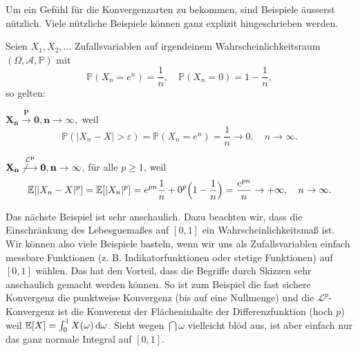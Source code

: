 Um ein Gef\"uhl f\"ur die Konvergenzarten zu bekommen, sind Beispiele \"ausserst n\"utzlich. Viele n\"utzliche Beispiele k\"onnen ganz explizit hingeschrieben werden.
\begin{beispiel}
	Seien $X_1, X_2, ... $ Zufallsvariablen auf irgendeinem Wahrscheinlichkeitsraum $(\Omega, \mathcal A,\mathbb P)$ mit  $$\mathbb{P}(X_n = e^n) = \frac{1}{n}, \quad \mathbb{P}(X_n = 0) = 1 - \frac{1}{n},$$ so gelten:\smallskip
	
	$\mathbf{X_n \overset{P}{\longrightarrow} 0, n \to \infty},$ weil $$\mathbb{P}(|X_n - X| > \varepsilon) = \mathbb{P}(X_n = e^n)=\frac{1}{n}\to 0, \quad n\to\infty.$$
	
	$\mathbf{X_n \overset{\mathcal{L}^p}{\not\longrightarrow} 0, n \to \infty}$, f\"ur alle $p\geq 1$, weil 
	$$\mathbb{E}[|X_n - X|^p] = \mathbb{E}[|X_n|^p] = e^{pn} \frac{1}{n} + 0^p\Big(1-\frac{1}{n}\Big) = \frac{e^{pn}}{n} \to +\infty,\quad n\to\infty.$$
\end{beispiel}
Das n\"achste Beispiel ist sehr anschaulich. Dazu beachten wir, dass die Einschr\"ankung des Lebesguema\ss es auf $[0,1]$ ein Wahrscheinlichkeitsma\ss{} ist. Wir k\"onnen also viele Beispiele basteln, wenn wir uns als Zufallsvariablen einfach messbare Funktionen (z. B. Indikatorfunktionen oder stetige Funktionen) auf $[0,1]$ w\"ahlen. Das hat den Vorteil, dass die Begriffe durch Skizzen sehr anschaulich gemacht werden k\"onnen. So ist zum Beispiel die fast sichere Konvergenz die punktweise Konvergenz (bis auf eine Nullmenge) und die $\mathcal L^p$-Konvergenz ist die Konverenz der Fl\"acheninhalte der Differenzfunktion (hoch $p$) weil $\mathbb{E}[X]=\int_0^1 X(\omega)\, \mathrm{d} \omega$. Sieht wegen $\dint \omega$ vielleicht bl\"od aus, ist aber einfach nur das ganz normale Integral auf $[0,1]$.
